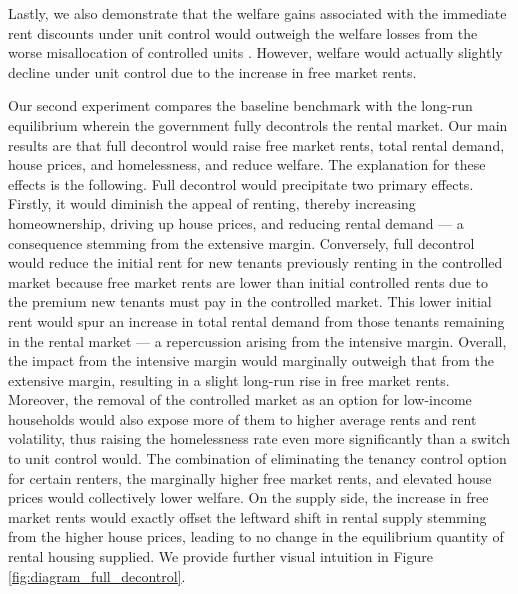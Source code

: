 \documentclass[parskip=full]{article}
\begin{document}
Lastly, we also demonstrate that the welfare gains associated with the immediate rent discounts under unit control would outweigh the welfare losses from the worse misallocation of controlled units \citep{gl-2003}. However, welfare would actually slightly decline under unit control due to the increase in free market rents.

Our second experiment compares the baseline benchmark with the long-run equilibrium wherein the government fully decontrols the rental market. Our main results are that full decontrol would raise free market rents, total rental demand, house prices, and homelessness, and reduce welfare. The explanation for these effects is the following. Full decontrol would precipitate two primary effects. Firstly, it would diminish the appeal of renting, thereby increasing homeownership, driving up house prices, and reducing rental demand --- a consequence stemming from the extensive margin. Conversely, full decontrol would reduce the initial rent for new tenants previously renting in the controlled market because free market rents are lower than initial controlled rents due to the premium new tenants must pay in the controlled market. This lower initial rent would spur an increase in total rental demand from those tenants remaining in the rental market --- a repercussion arising from the intensive margin. Overall, the impact from the intensive margin would marginally outweigh that from the extensive margin, resulting in a slight long-run rise in free market rents. Moreover, the removal of the controlled market as an option for low-income households would also expose more of them to higher average rents and rent volatility, thus raising the homelessness rate even more significantly than a switch to unit control would. The combination of eliminating the tenancy control option for certain renters, the marginally higher free market rents, and elevated house prices would collectively lower welfare. On the supply side, the increase in free market rents would exactly offset the leftward shift in rental supply stemming from the higher house prices, leading to no change in the equilibrium quantity of rental housing supplied. We provide further visual intuition in Figure \ref{fig:diagram_full_decontrol}.
\end{document}
